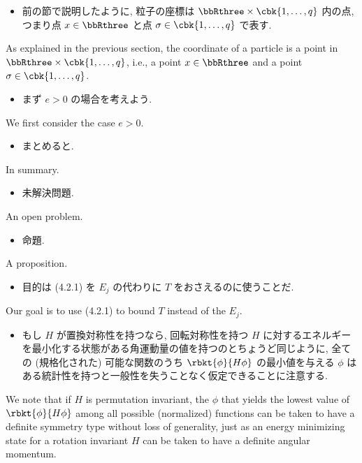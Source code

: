 \documentclass[openany, a4paper, oneside]{jsbook}
\begin{document}
\begin{itemize}
\item 前の節で説明したように, 粒子の座標は $\bbRthree \times \cbk{1, \dots, q}$ 内の点,
つまり点 $x \in \bbRthree$ と点 $\sigma \in \cbk{1, \dots, q}$ で表す. \cite{LiebSeiringer1}
\end{itemize}
As explained in the previous section, the coordinate of a particle is a point in $\bbRthree \times \cbk{1, \dots, q}$, i.e.,
a point $x \in \bbRthree$ and a point $\sigma \in \cbk{1, \dots, q}$.

\begin{itemize}
\item まず $e>0$ の場合を考えよう. \cite{LiebSeiringer1}
\end{itemize}
We first consider the case $e > 0$.

\begin{itemize}
\item まとめると.
\end{itemize}
In summary.

\begin{itemize}
\item 未解決問題.
\end{itemize}
An open problem.

\begin{itemize}
\item 命題.
\end{itemize}
A proposition.

\begin{itemize}
\item 目的は (4.2.1) を $E_j$ の代わりに $T$ をおさえるのに使うことだ. \cite{LiebSeiringer1}
\end{itemize}
Our goal is to use (4.2.1) to bound $T$ instead of the $E_j$.

\begin{itemize}
\item もし $H$ が置換対称性を持つなら, 回転対称性を持つ $H$ に対するエネルギーを最小化する状態がある角運動量の値を持つのとちょうど同じように,
全ての (規格化された) 可能な関数のうち $\rbkt{\phi}{H \phi}$ の最小値を与える
$\phi$ はある統計性を持つと一般性を失うことなく仮定できることに注意する. \cite{LiebSeiringer1}
\end{itemize}
We note that if $H$ is permutation invariant, the $\phi$ that yields the lowest value of $\rbkt{\phi}{H \phi}$ among
all possible (normalized) functions can be taken to have a definite symmetry type without loss of generality,
just as an energy minimizing state for a rotation invariant $H$ can be taken to have a definite angular momentum.
\end{document}

